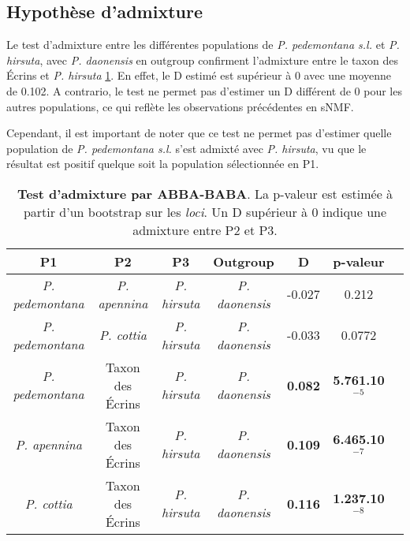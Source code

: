
\subsection{Hypothèse d'admixture}

Le test d'admixture entre les différentes populations de \textit{P. pedemontana s.l.} et \textit{P. hirsuta}, avec \textit{P. daonensis} en outgroup confirment l'admixture entre le taxon des Écrins et \textit{P. hirsuta} \ref{ABBA}. En effet, le D estimé est supérieur à 0 avec une moyenne de 0.102. A contrario, le test ne permet pas d'estimer un D différent de 0 pour les autres populations, ce qui reflète les observations précédentes en sNMF.

Cependant, il est important de noter que ce test ne permet pas d'estimer quelle population de \textit{P. pedemontana s.l.} s'est admixté avec \textit{P. hirsuta}, vu que le résultat est positif quelque soit la population sélectionnée en P1.

\begin{table}[!h]
\begin{tabular}{ccccccc}\\\toprule  
P1 & P2 & P3 & Outgroup & D & p-valeur \\ \midrule
\textit{P. pedemontana} & \textit{P. apennina} & \textit{P. hirsuta} & \textit{P. daonensis} & -0.027 & 0.212 \\
\textit{P. pedemontana} & \textit{P. cottia} & \textit{P. hirsuta} & \textit{P. daonensis} & -0.033 & 0.0772 \\ \midrule
\textit{P. pedemontana} & Taxon des Écrins & \textit{P. hirsuta} & \textit{P. daonensis} & \textbf{0.082} & \textbf{5.761.10$^{-5}$} \\
\textit{P. apennina} & Taxon des Écrins & \textit{P. hirsuta} & \textit{P. daonensis} & \textbf{0.109} & \textbf{6.465.10$^{-7}$} \\
\textit{P. cottia} & Taxon des Écrins & \textit{P. hirsuta} & \textit{P. daonensis} & \textbf{0.116} & \textbf{1.237.10$^{-8}$} \\ \bottomrule
\end{tabular}
\caption{\textbf{Test d'admixture par ABBA-BABA}. La p-valeur est estimée à partir d'un bootstrap sur les \textit{loci}. Un D supérieur à 0 indique une admixture entre P2 et P3.}
\label{ABBA}
\end{table}

